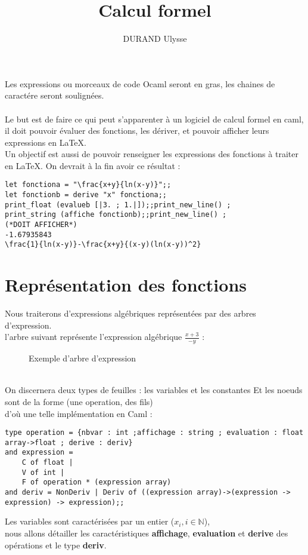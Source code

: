 \documentclass{article}
\title{Calcul formel}
\author{DURAND Ulysse}
\date{}
\theoremstyle{definition}
\newcommand*{\unefiguretikz}[2]{\begin{figure}[!h] \centering  \caption{#2} \end{figure}}
\begin{document}
\maketitle
Les expressions ou morceaux de code Ocaml seront en gras, les chaines de caract\'ere seront soulign\'ees.\\\\
Le but est de faire ce qui peut s'apparenter \`a un logiciel de calcul formel en caml, il doit pouvoir \'evaluer des fonctions, les d\'eriver, et pouvoir afficher leurs expressions en \LaTeX.\\
Un objectif est aussi de pouvoir renseigner les expressions des fonctions \`a traiter en \LaTeX.
On devrait \`a la fin avoir ce r\'esultat : 
\\

\begin{lstlisting}
let fonctiona = "\frac{x+y}{ln(x-y)}";;
let fonctionb = derive "x" fonctiona;;
print_float (evalueb [|3. ; 1.|]);;print_new_line() ;
print_string (affiche fonctionb);;print_new_line() ;
(*DOIT AFFICHER*)
-1.67935843
\frac{1}{ln(x-y)}-\frac{x+y}{(x-y)(ln(x-y))^2}
\end{lstlisting}

\section {Repr\'esentation des fonctions}
Nous traiterons d'expressions alg\'ebriques repr\'esent\'ees par des arbres d'expression.\\

l'arbre suivant repr\'esente l'expression alg\'ebrique $\frac{x+3}{-y}$ : \\
\unefiguretikz{arbrexpr}{Exemple d'arbre d'expression}
\\
On discernera deux types de feuilles : les variables et les constantes
Et les noeuds sont de la forme (une operation, des fils)\\
d'o\`u une telle impl\'ementation en Caml :

\begin{lstlisting}
type operation = {nbvar : int ;affichage : string ; evaluation : float array->float ; derive : deriv}
and expression = 
    C of float |
    V of int |
    F of operation * (expression array)
and deriv = NonDeriv | Deriv of ((expression array)->(expression -> expression) -> expression);;
\end{lstlisting}

Les variables sont caract\'eris\'ees par un entier ($x_i, i\in\mathbb{N}$),\\ nous allons
d\'etailler les caract\'eristiques \textbf{affichage}, \textbf{evaluation} et \textbf{derive} des op\'erations et le type \textbf{deriv}.\\
\end{document}
